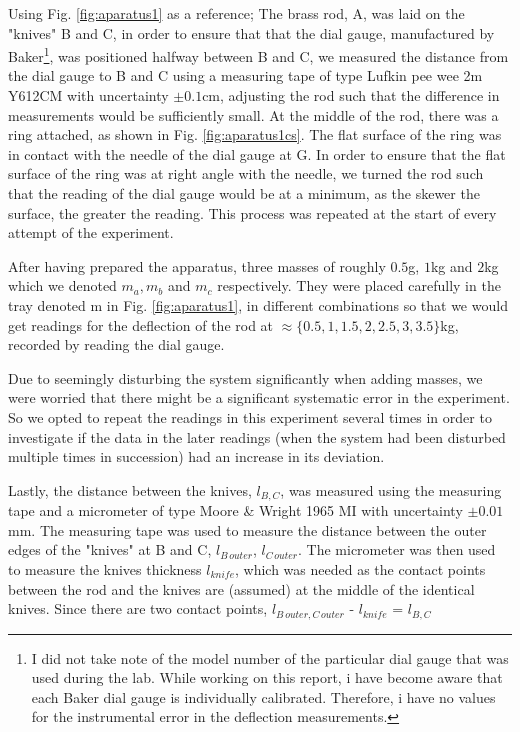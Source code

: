 \documentclass[11pt,a4paper]{article}
\begin{document}
    Using Fig. \ref{fig:aparatus1} as a reference; The brass rod, A, was laid on the "knives" B and C, in order to ensure that that the dial gauge, manufactured by Baker\footnote{I did not take note of the model number of the particular dial gauge that was used during the lab. While working on this report, i have become aware that each Baker dial gauge is individually calibrated. Therefore, i have no values for the instrumental error in the deflection measurements.}, was positioned halfway between B and C, we measured the distance from the dial gauge to B and C using a measuring tape of type Lufkin pee wee 2m Y612CM with uncertainty $\pm 0.1$cm, adjusting the rod such that the difference in measurements would be sufficiently small. At the middle of the rod, there was a ring attached, as shown in Fig. \ref{fig:aparatus1cs}. The flat surface of the ring was in contact with the needle of the dial gauge at G. In order to ensure that the flat surface of the ring was at right angle with the needle, we turned the rod such that the reading of the dial gauge would be at a minimum, as the skewer the surface, the greater the reading. This process was repeated at the start of every attempt of the experiment.

    After having prepared the apparatus, three masses of roughly $0.5$g, $1$kg and $2$kg which we denoted $m_a, m_b$ and $m_c$ respectively. They were placed carefully in the tray denoted m in Fig. \ref{fig:aparatus1}, in different combinations so that we would get readings for the deflection of the rod at $\approx \{0.5, 1, 1.5, 2, 2.5, 3, 3.5\}$kg, recorded by reading the dial gauge.

    Due to seemingly disturbing the system significantly when adding masses, we were worried that there might be a significant systematic error in the experiment. So we opted to repeat the readings in this experiment several times in order to investigate if the data in the later readings (when the system had been disturbed multiple times in succession) had an increase in its deviation.

    Lastly, the distance between the knives, $l_{B, C}$, was measured using the measuring tape and a micrometer of type Moore \& Wright 1965 MI with uncertainty $\pm0.01$mm. The measuring tape was used to measure the distance between the outer edges of the "knives" at B and C, $l_{B\, outer}$, $l_{C\, outer}$. The micrometer was then used to measure the knives thickness $l_{knife}$, which was needed as the contact points between the rod and the knives are (assumed) at the middle of the identical knives. Since there are two contact points, $l_{B\,outer, C\, outer}$ - $l_{knife}$ = $l_{B, C}$
    
\end{document}
